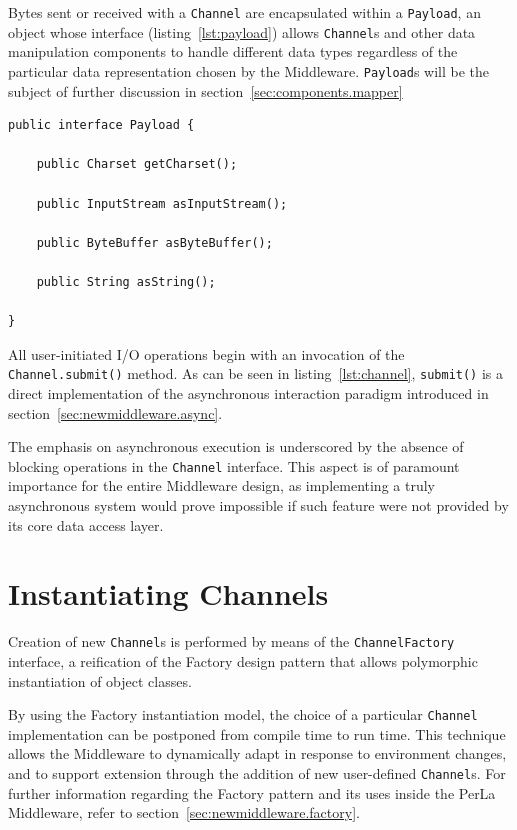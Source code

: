 Bytes sent or received with a \texttt{Channel} are encapsulated within a \texttt{Payload}, an object whose interface (listing~\ref{lst:payload}) allows \texttt{Channel}s and other data manipulation components to handle different data types regardless of the particular data representation chosen by the Middleware. \texttt{Payload}s will be the subject of further discussion in section~\ref{sec:components.mapper}

\lstset{language=Java}
\begin{lstlisting}[float,caption=The Payload interface,label={lst:payload}]
public interface Payload {

	public Charset getCharset();

	public InputStream asInputStream();

	public ByteBuffer asByteBuffer();

	public String asString();

}
\end{lstlisting}

All user-initiated I/O operations begin with an invocation of the \texttt{Channel.submit()} method. As can be seen in listing~\ref{lst:channel}, \texttt{submit()} is a direct implementation of the asynchronous interaction paradigm introduced in section~\ref{sec:newmiddleware.async}.

The emphasis on asynchronous execution is underscored by the absence of blocking operations in the \texttt{Channel} interface. This aspect is of paramount importance for the entire Middleware design, as implementing a truly asynchronous system would prove impossible if such feature were not provided by its core data access layer.


\section{Instantiating Channels}

Creation of new \texttt{Channel}s is performed by means of the  \texttt{ChannelFactory} interface, a reification of the Factory design pattern that allows polymorphic instantiation of object classes.

By using the Factory instantiation model, the choice of a particular \texttt{Channel} implementation can be postponed from compile time to run time. This technique allows the Middleware to dynamically adapt in response to environment changes, and to support extension through the addition of new user-defined \texttt{Channel}s. For further information regarding the Factory pattern and its uses inside the PerLa Middleware, refer to section~\ref{sec:newmiddleware.factory}.

